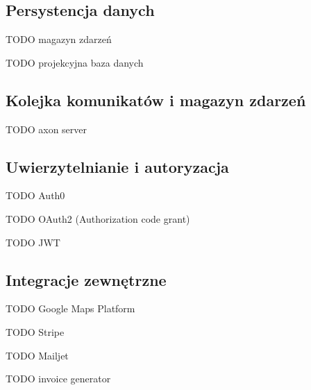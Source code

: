 \subsection{Persystencja danych}

TODO magazyn zdarzeń

TODO projekcyjna baza danych

\subsection{Kolejka komunikatów i magazyn zdarzeń}

TODO axon server

\subsection{Uwierzytelnianie i autoryzacja}

TODO Auth0

TODO OAuth2 (Authorization code grant)

TODO JWT

\subsection{Integracje zewnętrzne}

TODO Google Maps Platform

TODO Stripe

TODO Mailjet

TODO invoice generator